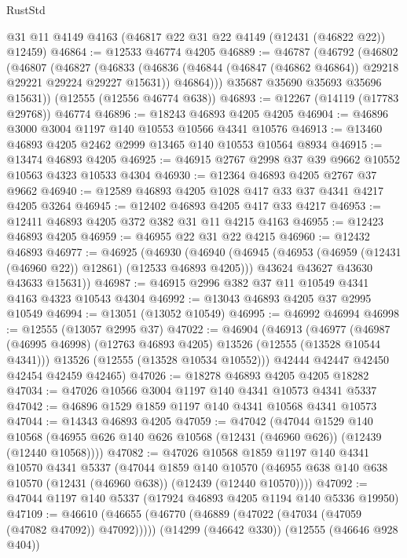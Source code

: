 \begin{lexlean}{RustStd}
\begin{coremodule}
    @31
    @11
    @4149
    @4163
    (@46817 @22 @31 @22 @4149 (@12431 (@46822 @22)) @12459)
@46864 := @12533 @46774 @4205
@46889 := @46787
    (@46792
      (@46802
        (@46807
          (@46827
            (@46833
              (@46836 (@46844 (@46847 (@46862 @46864)) @29218 @29221 @29224 @29227 @15631))
              @46864)))
        @35687
        @35690
        @35693
        @35696
        @15631))
    (@12555 (@12556 @46774 @638))
@46893 := @12267 (@14119 (@17783 @29768)) @46774
@46896 := @18243 @46893 @4205 @4205
@46904 := @46896 @3000 @3004 @1197 @140 @10553 @10566 @4341 @10576
@46913 := @13460 @46893 @4205 @2462 @2999 @13465 @140 @10553 @10564 @8934
@46915 := @13474 @46893 @4205
@46925 := @46915 @2767 @2998 @37 @39 @9662 @10552 @10563 @4323 @10533 @4304
@46930 := @12364 @46893 @4205 @2767 @37 @9662
@46940 := @12589 @46893 @4205 @1028 @417 @33 @37 @4341 @4217 @4205 @3264
@46945 := @12402 @46893 @4205 @417 @33 @4217
@46953 := @12411 @46893 @4205 @372 @382 @31 @11 @4215 @4163
@46955 := @12423 @46893 @4205
@46959 := @46955 @22 @31 @22 @4215
@46960 := @12432 @46893
@46977 := @46925
    (@46930
      (@46940
        (@46945 (@46953 (@46959 (@12431 (@46960 @22)) @12861) (@12533 @46893 @4205)))
        @43624
        @43627
        @43630
        @43633
        @15631))
@46987 := @46915 @2996 @382 @37 @11 @10549 @4341 @4163 @4323 @10543 @4304
@46992 := @13043 @46893 @4205 @37 @2995 @10549
@46994 := @13051 (@13052 @10549)
@46995 := @46992 @46994
@46998 := @12555 (@13057 @2995 @37)
@47022 := @46904
    (@46913
      (@46977
        (@46987 (@46995 @46998) (@12763 @46893 @4205) @13526 (@12555 (@13528 @10544 @4341)))
        @13526
        (@12555 (@13528 @10534 @10552)))
      @42444
      @42447
      @42450
      @42454
      @42459
      @42465)
@47026 := @18278 @46893 @4205 @4205 @18282
@47034 := @47026 @10566 @3004 @1197 @140 @4341 @10573 @4341 @5337
@47042 := @46896 @1529 @1859 @1197 @140 @4341 @10568 @4341 @10573
@47044 := @14343 @46893 @4205
@47059 := @47042
    (@47044
      @1529
      @140
      @10568
      (@46955 @626 @140 @626 @10568 (@12431 (@46960 @626)) (@12439 (@12440 @10568))))
@47082 := @47026
    @10568
    @1859
    @1197
    @140
    @4341
    @10570
    @4341
    @5337
    (@47044
      @1859
      @140
      @10570
      (@46955 @638 @140 @638 @10570 (@12431 (@46960 @638)) (@12439 (@12440 @10570))))
@47092 := @47044 @1197 @140 @5337 (@17924 @46893 @4205 @1194 @140 @5336 @19950)
@47109 := @46610
    (@46655 (@46770 (@46889 (@47022 (@47034 (@47059 (@47082 @47092)) @47092)))))
    (@14299 (@46642 @330))
    (@12555 (@46646 @928 @404))

\end{coremodule}
\end{lexlean}
